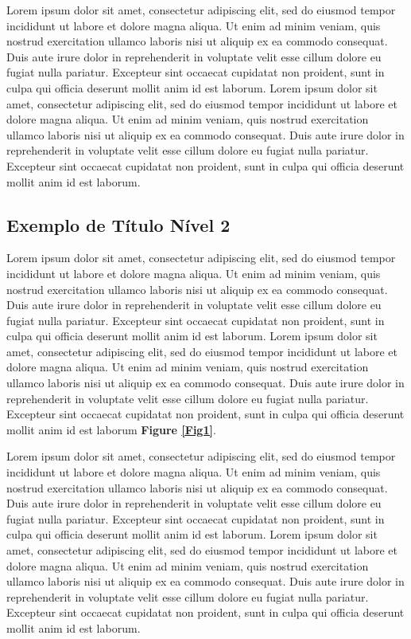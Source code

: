 \documentclass[spanish]{sbc2025}%
\begin{document}
Lorem ipsum dolor sit amet, consectetur adipiscing elit, sed do eiusmod tempor incididunt ut labore et dolore magna aliqua. Ut enim ad minim veniam, quis nostrud exercitation ullamco laboris nisi ut aliquip ex ea commodo consequat. Duis aute irure dolor in reprehenderit in voluptate velit esse cillum dolore eu fugiat nulla pariatur. Excepteur sint occaecat cupidatat non proident, sunt in culpa qui officia deserunt mollit anim id est laborum. Lorem ipsum dolor sit amet, consectetur adipiscing elit, sed do eiusmod tempor incididunt ut labore et dolore magna aliqua. Ut enim ad minim veniam, quis nostrud exercitation ullamco laboris nisi ut aliquip ex ea commodo consequat. Duis aute irure dolor in reprehenderit in voluptate velit esse cillum dolore eu fugiat nulla pariatur. Excepteur sint occaecat cupidatat non proident, sunt in culpa qui officia deserunt mollit anim id est laborum.


\subsection{Exemplo de Título Nível 2}

Lorem ipsum dolor sit amet, consectetur adipiscing elit, sed do eiusmod tempor incididunt ut labore et dolore magna aliqua. Ut enim ad minim veniam, quis nostrud exercitation ullamco laboris nisi ut aliquip ex ea commodo consequat. Duis aute irure dolor in reprehenderit in voluptate velit esse cillum dolore eu fugiat nulla pariatur. Excepteur sint occaecat cupidatat non proident, sunt in culpa qui officia deserunt mollit anim id est laborum. Lorem ipsum dolor sit amet, consectetur adipiscing elit, sed do eiusmod tempor incididunt ut labore et dolore magna aliqua. Ut enim ad minim veniam, quis nostrud exercitation ullamco laboris nisi ut aliquip ex ea commodo consequat. Duis aute irure dolor in reprehenderit in voluptate velit esse cillum dolore eu fugiat nulla pariatur. Excepteur sint occaecat cupidatat non proident, sunt in culpa qui officia deserunt mollit anim id est laborum \textbf{Figure \ref{Fig1}}.

Lorem ipsum dolor sit amet, consectetur adipiscing elit, sed do eiusmod tempor incididunt ut labore et dolore magna aliqua. Ut enim ad minim veniam, quis nostrud exercitation ullamco laboris nisi ut aliquip ex ea commodo consequat. Duis aute irure dolor in reprehenderit in voluptate velit esse cillum dolore eu fugiat nulla pariatur. Excepteur sint occaecat cupidatat non proident, sunt in culpa qui officia deserunt mollit anim id est laborum. Lorem ipsum dolor sit amet, consectetur adipiscing elit, sed do eiusmod tempor incididunt ut labore et dolore magna aliqua. Ut enim ad minim veniam, quis nostrud exercitation ullamco laboris nisi ut aliquip ex ea commodo consequat. Duis aute irure dolor in reprehenderit in voluptate velit esse cillum dolore eu fugiat nulla pariatur. Excepteur sint occaecat cupidatat non proident, sunt in culpa qui officia deserunt mollit anim id est laborum.
\end{document}
